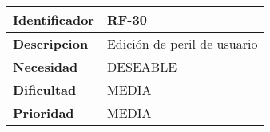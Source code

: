 \begin{center}
    \begin{tabular}{|p{2.6cm}|p{12cm}|}
    \hline
    \textbf{Identificador} & RF-30\\
    \hline
    \textbf{Descripcion} & Edición de peril de usuario\\
    \hline
    \textbf{Necesidad} & DESEABLE\\
    \hline
    \textbf{Dificultad} & MEDIA\\
    \hline
    \textbf{Prioridad} & MEDIA\\
    \hline
    \end{tabular}
\end{center}
